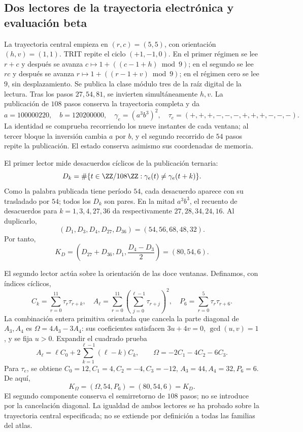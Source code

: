 \subsection{Dos lectores de la trayectoria electrónica y evaluación beta}
\label{vi:vi:dep:beta}

La trayectoria central empieza en \((r,c)=(5,5)\), con
orientación \((h,v)=(1,1)\). TRIT repite el ciclo \((+1,-1,0)\).
En el primer régimen se lee \(r+c\) y después se avanza
\(c\mapsto1+((c-1+h)\bmod9)\); en el segundo se lee \(rc\) y
después se avanza \(r\mapsto1+((r-1+v)\bmod9)\); en el régimen
cero se lee \(9\), sin desplazamiento. Se publica la clase módulo
tres de la raíz digital de la lectura. Tras los pasos \(27,54,81\),
se invierten simultáneamente \(h,v\). La publicación de \(108\)
pasos conserva la trayectoria completa y da
\begin{equation}
 a=100000220,\quad b=120200000,\quad
 \gamma_e=(a^3b^3)^2,
 \quad\tau_e=(+,+,+,-,-,-,+,+,+,-,-,-).
 \label{vi:vi:dep:trayectoria-electron}
\end{equation}
La identidad se comprueba recorriendo los nueve instantes de cada
ventana; al tercer bloque la inversión cambia \(a\) por \(b\),
y el segundo recorrido de \(54\) pasos repite la publicación.
El estado conserva asimismo sus coordenadas de memoria.

El primer lector mide desacuerdos cíclicos de la publicación ternaria:
\[
 D_k=\#\{t\in\ZZ/108\ZZ:\gamma_e(t)\ne\gamma_e(t+k)\}.
\]
Como la palabra publicada tiene período \(54\), cada desacuerdo
aparece con su trasladado por \(54\); todos los \(D_k\) son pares.
En la mitad \(a^3b^3\), el recuento de desacuerdos para
\(k=1,3,4,27,36\) da respectivamente \(27,28,34,24,16\).
Al duplicarlo,
\[
 (D_1,D_3,D_4,D_{27},D_{36})=(54,56,68,48,32).
\]
Por tanto,
\begin{equation}
 K_D=\left(D_{27}+D_{36},D_1,\frac{D_4-D_3}{2}\right)
     =(80,54,6).
 \label{vi:vi:dep:KD}
\end{equation}

El segundo lector actúa sobre la orientación de las doce ventanas.
Definamos, con índices cíclicos,
\[
 C_k=\sum_{r=0}^{11}\tau_r\tau_{r+k},\quad
 A_\ell=\sum_{r=0}^{11}\left(\sum_{j=0}^{\ell-1}\tau_{r+j}\right)^2,
 \quad P_6=\sum_{r=0}^{5}\tau_r\tau_{r+6}.
\]
La combinación entera primitiva orientada que cancela la parte diagonal
de \(A_3,A_4\) es \(\Omega=4A_3-3A_4\): sus coeficientes
satisfacen \(3u+4v=0\), \(\gcd(u,v)=1\), y se fija \(u>0\).
Expandir el cuadrado prueba
\[
 A_\ell=\ell C_0+
     2\sum_{k=1}^{\ell-1}(\ell-k)C_k,
 \qquad\Omega=-2C_1-4C_2-6C_3.
\]
Para \(\tau_e\), se obtiene
\(C_0=12,C_1=4,C_2=-4,C_3=-12\),
\(A_3=44,A_4=32,P_6=6\). De aquí,
\begin{equation}
 K_\Omega=(\Omega,54,P_6)=(80,54,6)=K_D.
 \label{vi:vi:dep:KOmega}
\end{equation}
El segundo componente conserva el semirretorno de \(108\) pasos;
no se introduce por la cancelación diagonal. La igualdad de ambos
lectores se ha probado sobre la trayectoria central especificada;
no se extiende por definición a todas las familias del atlas.

